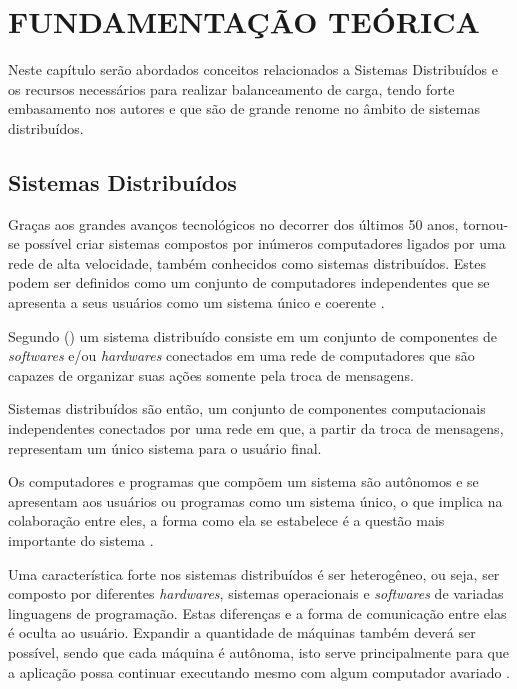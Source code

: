 \chapter{FUNDAMENTAÇÃO TEÓRICA}

Neste capítulo serão abordados conceitos relacionados a Sistemas Distribuídos e os recursos necessários para realizar balanceamento de carga, tendo forte embasamento nos autores  e  que são de grande renome no âmbito de sistemas distribuídos.

\section{Sistemas Distribuídos}
	Graças aos grandes avanços tecnológicos no decorrer dos últimos 50 anos, tornou-se possível criar sistemas compostos por inúmeros computadores ligados por uma rede de alta velocidade, também conhecidos como sistemas distribuídos. Estes podem ser definidos como um conjunto de computadores independentes que se apresenta a seus usuários como um sistema único e coerente \cite{Tanenbaum}.
	
	Segundo  (\citeyear{Coulouris-2012}) um sistema distribuído consiste em um conjunto de componentes de \textit{softwares} e/ou \textit{hardwares} conectados em uma rede de computadores que são capazes de organizar suas ações somente pela troca de mensagens.
	
	Sistemas distribuídos são então, um conjunto de componentes computacionais independentes conectados por uma rede em que, a partir da troca de mensagens, representam um único sistema para o usuário final.
	
	Os computadores e programas que compõem um sistema são autônomos e se apresentam aos usuários ou programas como um sistema único, o que implica na colaboração entre eles, a forma como ela se estabelece é a questão mais importante do sistema \cite{Tanenbaum}. 
	
	Uma característica forte nos sistemas distribuídos é ser heterogêneo, ou seja, ser composto por diferentes \textit{hardwares}, sistemas operacionais e \textit{softwares} de variadas linguagens de programação. Estas diferenças e a forma de comunicação entre elas é oculta ao usuário. Expandir a quantidade de máquinas também deverá ser possível, sendo que cada máquina é autônoma, isto serve principalmente para que a aplicação possa continuar executando mesmo com algum computador avariado \cite{Tanenbaum}.
	
